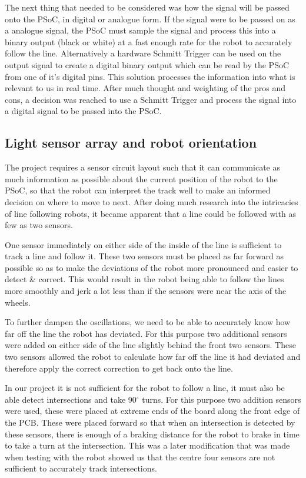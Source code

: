 \documentclass{article}
\begin{document}
The next thing that needed to be considered was how the signal will be passed onto the PSoC, in digital or analogue form. If the signal were to be passed on as a analogue signal, the PSoC must sample the signal and process this into a binary output (black or white) at a fast enough rate for the robot to accurately follow the line. Alternatively a hardware Schmitt Trigger can be used on the output signal to create a digital binary output which can be read by the PSoC from one of it's digital pins. This solution processes the information into what is relevant to us in real time. After much thought and weighting of the pros and cons, a decision was reached to  use a Schmitt Trigger and process the signal into a digital signal to be passed into the PSoC.

\subsection{Light sensor array and robot orientation}

The project requires a sensor circuit layout such that it can communicate as much information as possible about the current position of the robot to the PSoC, so that the robot can interpret the track well to make an informed decision on where to move to next. After doing much research into the intricacies of line following robots, it became apparent that a line could be followed with as few as two sensors.

One sensor immediately on either side of the inside of the line is sufficient to track a line and follow it. These two sensors must be placed as far forward as possible so as to make the deviations of the robot more pronounced and easier to detect \& correct. This would result in the robot being able to follow the lines more smoothly and jerk a lot less than if the sensors were near the axis of the wheels. 

To further dampen the oscillations, we need to be able to accurately know how far off the line the robot has deviated. For this purpose two additional sensors were added on either side of the line slightly behind the front two sensors. These two sensors allowed the robot to calculate how far off the line it had deviated and therefore apply the correct correction to get back onto the line. 

In our project it is not sufficient for the robot to follow a line, it must also be able detect intersections and take 90$^{\circ}$ turns. For this purpose two addition sensors were used, these were placed at extreme ends of the board along the front edge of the PCB. These were placed forward so that when an intersection is detected by these sensors, there is enough of a braking distance for the robot to brake in time to take a turn at the intersection. This was a later modification that was made when testing with the robot showed us that the centre four sensors are not sufficient to accurately track intersections.
\end{document}

